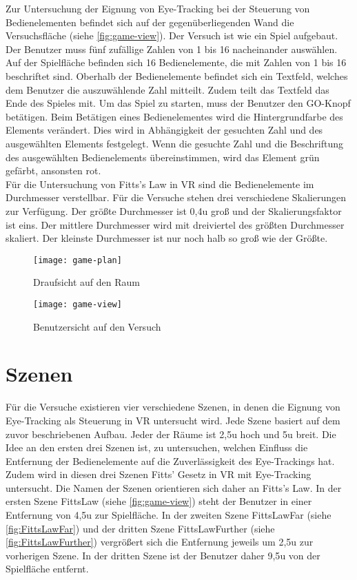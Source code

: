 Zur Untersuchung der Eignung von Eye-Tracking bei der Steuerung von Bedienelementen befindet sich auf der gegenüberliegenden Wand die Versuchsfläche (siehe \autoref{fig:game-view}). Der Versuch ist wie ein Spiel aufgebaut. Der Benutzer muss fünf zufällige Zahlen von 1 bis 16 nacheinander auswählen. Auf der Spielfläche befinden sich 16 Bedienelemente, die mit Zahlen von 1 bis 16 beschriftet sind. Oberhalb der Bedienelemente befindet sich ein Textfeld, welches dem Benutzer die auszuwählende Zahl mitteilt. Zudem teilt das Textfeld das Ende des Spieles mit. Um das Spiel zu starten, muss der Benutzer den GO-Knopf betätigen. Beim Betätigen eines Bedienelementes wird die Hintergrundfarbe des Elements verändert. Dies wird in Abhängigkeit der gesuchten Zahl und des ausgewählten Elements festgelegt. Wenn die gesuchte Zahl und die Beschriftung des ausgewählten Bedienelements übereinstimmen, wird das Element grün gefärbt, ansonsten rot. \\
Für die Untersuchung von Fitts's Law in \ac{VR} sind die Bedienelemente im Durchmesser verstellbar. Für die Versuche stehen drei verschiedene Skalierungen zur Verfügung. Der größte Durchmesser ist 0,4\ac{u} groß und der Skalierungsfaktor ist eins. Der mittlere Durchmesser wird mit dreiviertel des größten Durchmesser skaliert. Der kleinste Durchmesser ist nur noch halb so groß wie der Größte.

\begin{figure}[!htbp]
	\centering
	\texttt{[image: game-plan]}
	\caption[Draufsicht auf den Raum]{Draufsicht auf den Raum}
	\label{fig:game-plan}
\end{figure}

\begin{figure}[!htbp]
\centering
\texttt{[image: game-view]}
\caption[Benutzersicht auf den Versuch]{Benutzersicht auf den Versuch}
\label{fig:game-view}
\end{figure}

\section{Szenen}
Für die Versuche existieren vier verschiedene Szenen, in denen die Eignung von Eye-Tracking als Steuerung in \ac{VR} untersucht wird. Jede Szene basiert auf dem zuvor beschriebenen Aufbau. Jeder der Räume ist 2,5\ac{u} hoch und 5\ac{u} breit. Die Idee an den ersten drei Szenen ist, zu untersuchen, welchen Einfluss die Entfernung der Bedienelemente auf die Zuverlässigkeit des Eye-Trackings hat. Zudem wird in diesen drei Szenen Fitts' Gesetz in \ac{VR} mit Eye-Tracking untersucht. Die Namen der Szenen orientieren sich daher an Fitts's Law. In der ersten Szene \glqq FittsLaw\grqq{} (siehe \autoref{fig:game-view}) steht der Benutzer in einer Entfernung von 4,5\ac{u} zur Spielfläche. In der zweiten Szene \glqq FittsLawFar\grqq{} (siehe \autoref{fig:FittsLawFar}) und der dritten Szene \glqq FittsLawFurther\grqq{} (siehe \autoref{fig:FittsLawFurther}) vergrößert sich die Entfernung jeweils um 2,5\ac{u} zur vorherigen Szene. In der dritten Szene ist der Benutzer daher 9,5\ac{u} von der Spielfläche entfernt. 


